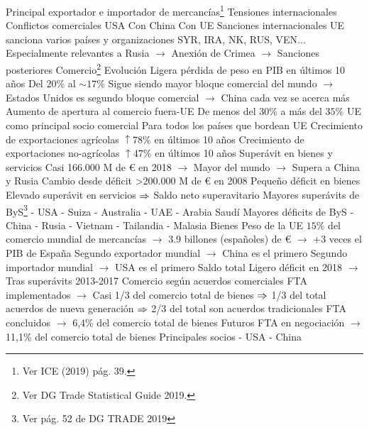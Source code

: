 \documentclass{nuevotema}
\begin{document}
\begin{esquemal}
				\4 Principal exportador e importador de mercancías\footnote{Ver ICE (2019) pág. 39.}
			\3 Tensiones internacionales
				\4 Conflictos comerciales USA
				\4[] Con China
				\4[] Con UE
				\4 Sanciones internacionales
				\4[] UE sanciona varios países y organizaciones
				\4[] SYR, IRA, NK, RUS, VEN...
				\4[] Especialmente relevantes a Rusia
				\4[] $\to$ Anexión de Crimea
				\4[] $\to$ Sanciones posteriores
		\2 Comercio\footnote{Ver DG Trade Statistical Guide 2019.}
			\3 Evolución
				\4 Ligera pérdida de peso en PIB en últimos 10 años
				\4[] Del $20\%$ al $\sim 17\%$
				\4[] Sigue siendo mayor bloque comercial del mundo
				\4[] $\to$ Estados Unidos es segundo bloque comercial
				\4[] $\to$ China cada vez se acerca más
				\4 Aumento de apertura al comercio fuera-UE
				\4[] De menos del $30\%$ a más del $35\%$
				\4 UE como principal socio comercial
				\4[] Para todos los países que bordean UE
				\4 Crecimiento de exportaciones agrícolas
				\4[] $\uparrow 78\%$ en últimos 10 años
				\4 Crecimiento de exportaciones no-agrícolas
				\4[] $\uparrow 47\%$ en últimos 10 años
				\4 Superávit en bienes y servicios
				\4[] Casi 166.000 M de € en 2018
				\4[] $\to$ Mayor del mundo
				\4[] $\to$ Supera a China y Rusia
				\4[] Cambio desde déficit >200.000 M de € en 2008
				\4[] Pequeño déficit en bienes
				\4[] Elevado superávit en servicios
				\4[] $\Rightarrow$ Saldo neto superavitario
				\4 Mayores superávits de ByS\footnote{Ver pág. 52 de DG TRADE 2019}
				 - USA
				 - Suiza
				 - Australia
				 - UAE
				 - Arabia Saudí
				\4 Mayores déficits de ByS
				 - China
				 - Rusia
				 - Vietnam
				 - Tailandia
				 - Malasia
			\3 Bienes
				\4 Peso de la UE
				\4[] $15\%$ del comercio mundial de mercancías
				\4[] $\to$ 3.9 billones (españoles) de €
				\4[] $\to$ +3 veces el PIB de España
				\4[] Segundo exportador mundial
				\4[] $\to$ China es el primero
				\4[] Segundo importador mundial
				\4[] $\to$ USA es el primero
				\4 Saldo total
				\4[] Ligero déficit en 2018
				\4[] $\to$ Tras superávits 2013-2017
				\4 Comercio según acuerdos comerciales
				\4[] FTA implementados
				\4[] $\to$ Casi 1/3 del comercio total de bienes
				\4[] $\Rightarrow$ 1/3 del total acuerdos de nueva generación
				\4[] $\Rightarrow$ 2/3 del total son acuerdos tradicionales
				\4[] FTA concluidos
				\4[] $\to$ 6,4\% del comercio total de bienes
				\4[] Futuros FTA en negociación
				\4[] $\to$ 11,1\% del comercio total de bienes
				\4 Principales socios
				 - USA
				 - China

\end{esquemal}
\end{document}

